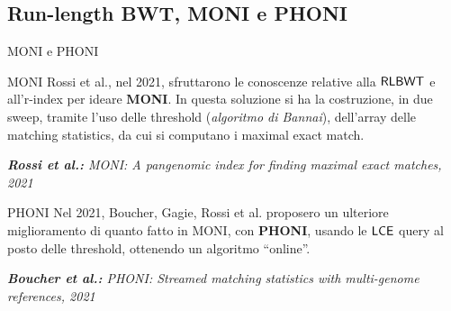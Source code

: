 \documentclass[]{beamer}
\def\LCE{\mbox{\rm {\sf LCE}}}
\def\RLBWT{\mbox{\rm {\sf RLBWT}}}
\def\LCE{\mbox{\rm {\sf LCE}}}
\begin{document}
\subsection{Run-length BWT, MONI e PHONI}
\begin{frame}{MONI e PHONI}
  \begin{block}{MONI}
    \small
    Rossi et al., nel 2021, sfruttarono le conoscenze relative
    alla $\RLBWT$ e all'r-index 
    per ideare \textbf{MONI}. In questa soluzione si ha la costruzione, in due
    sweep, tramite l'uso delle threshold (\textit{algoritmo di
      Bannai}), dell'array delle matching statistics, da cui si computano i
    maximal exact match. 
  \end{block}
  \begin{alertblock}{}
    \footnotesize{\textit{\textbf{Rossi et al.:}
        MONI: A pangenomic index for finding maximal exact matches, 2021}}
  \end{alertblock}
  \begin{block}{PHONI}
    \small
    Nel 2021, Boucher, Gagie, Rossi et al. proposero un ulteriore miglioramento di
    quanto fatto in MONI, con \textbf{PHONI}, usando le
    $\LCE$ query 
    al posto delle threshold, ottenendo un algoritmo ``online''.
  \end{block}
  \begin{alertblock}{}
    \footnotesize{\textit{\textbf{Boucher et al.:}
        PHONI: Streamed matching statistics with multi-genome references, 2021}}
  \end{alertblock}
\end{frame}
\end{document}
